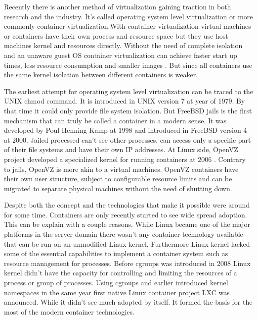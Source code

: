 \documentclass[12pt,oneandhalf,chaparabic,ceng,ms,eng,oneside,pntc]{gsufbe}
\begin{document}
Recently there is another method of virtualization gaining traction in both research and the industry.
It's called operating system level virtualization or more commonly container virtualization.With
container virtualization virtual machines or containers have their own process and resource space but
they use host machines kernel and resources directly. Without the need of complete isolation and an
unaware guest OS container virtualization can achieve faster start up times, less resource consumption
and smaller images \cite{joy_performance_2015}. But since all containers use the same kernel isolation
between different containers is weaker.

The earliest attempt for operating system level virtualization can be traced to the UNIX chmod command.
It is introduced in UNIX version 7 at year of 1979. By that time it could only provide file system
isolation. But FreeBSD jails is the first mechanism that can truly be called a container in a modern
sense. It was developed by Poul-Henning Kamp at 1998 and introduced in FreeBSD version 4 at 2000.
\cite{kamp_jails_2000}
Jailed processed can't see other processes, can access only a specific part of their file systems and
have their own IP addresses. At Linux side, OpenVZ project developed a specialized kernel for running
containers at 2006 \cite{kolyshkin_virtualization_2006}. Contrary to jails, OpenVZ is more akin to a
virtual machines. OpenVZ containers
have their own user structure, subject to configurable resource limits and can be migrated to separate
physical machines without the need of shutting down. \cite{bernstein_containers_2014}

Despite both the concept and the technologies that make it possible were around for some time.
Containers are only recently started to see wide spread adoption. This can be explain with a couple
reasons. While Linux became one of the major platforms in the server domain there wasn't any container
technology available that can be run on an unmodified Linux kernel. Furthermore Linux kernel lacked
some of the essential capabilities to implement a container system such as resource management for
processes. Before cgroups was introduced in 2008 Linux kernel didn't have the capacity for controlling
and limiting the resources of a process or group of processes. Using cgroups and earlier introduced
kernel namespaces in the same year first native Linux
container project LXC \cite{lxc} was announced. While it didn't see much adopted by itself. It formed
the basis
for the most of the modern container technologies. \cite{singh_containers_2016}
\end{document}
